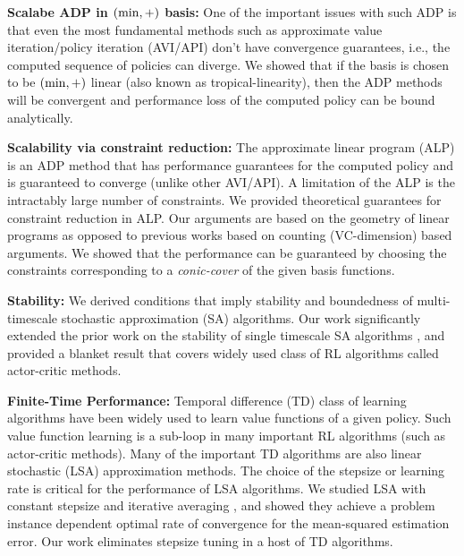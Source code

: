 \documentclass[onecolumn,12pt]{IEEEtran}
\begin{document}
\textbf{Scalabe ADP in $(\min,+)$ basis:} 
One of the important issues with such ADP is that even the most fundamental methods such as approximate value iteration/policy iteration (AVI/API) don't have convergence guarantees, i.e., the computed sequence of policies can diverge. We \cite{cdc} showed that if the basis is chosen to be $(\min,+)$ linear (also known as tropical-linearity), then the ADP methods will be convergent and performance loss of the computed policy can be bound analytically.

\textbf{Scalability via constraint reduction:} The approximate linear program (ALP) is an ADP method that has performance guarantees \cite{alp} for the computed policy and is guaranteed to converge (unlike other AVI/API). A limitation of the ALP is the intractably large number of constraints.  We \cite{alp-aaai,alp-ieee} provided theoretical guarantees for constraint reduction in ALP. Our arguments are based on the geometry of linear programs as opposed to previous works \cite{cs} based on counting (VC-dimension) based arguments. We showed that the performance can be guaranteed by choosing the constraints corresponding to a \emph{conic-cover} of the given basis functions.

\textbf{Stability:} We derived \cite{automatica} conditions that imply stability and boundedness of multi-timescale stochastic approximation (SA) algorithms. Our work significantly extended the prior work on the stability of single timescale SA algorithms \cite{borkar-meyn}, and provided a blanket result that covers widely used class of RL algorithms called actor-critic methods. 

\textbf{Finite-Time Performance:} Temporal difference (TD) class of learning algorithms have been widely used to learn value functions of a given policy. Such value function learning is a sub-loop in many important RL algorithms (such as actor-critic methods). Many of the important TD algorithms are also linear stochastic (LSA) approximation methods. The choice of the stepsize or learning rate is critical for the performance of LSA algorithms. We studied LSA with constant stepsize and iterative averaging \cite{aistats}, and showed they achieve a problem instance dependent optimal rate of convergence for the mean-squared estimation error. Our work eliminates stepsize tuning in a host of TD algorithms.
\end{document}
